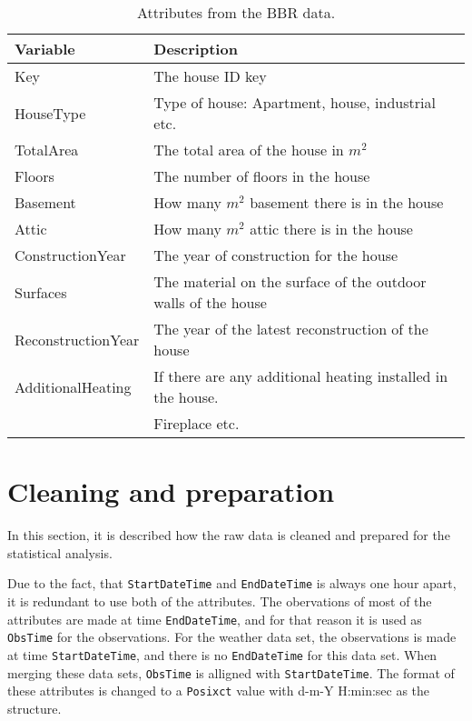 \begin{table}[H]
    \centering
    \begin{tabular}{ll}
     \hline
     \textbf{Variable} & \textbf{Description} \\
    \hline
    \hline
    Key  &  The house ID key\\
    HouseType  &  Type of house: Apartment, house, industrial etc. \\
    TotalArea  & The total area of the house in $m^2$ \\
    Floors  & The number of floors in the house \\
    Basement  & How many $m^2$ basement there is in the house \\
    Attic  & How many $m^2$ attic there is in the house \\
    ConstructionYear  & The year of construction for the house  \\
    Surfaces  & The material on the surface of the outdoor walls of the house \\
    ReconstructionYear  & The year of the latest reconstruction of the house \\
    AdditionalHeating  & If there are any additional heating installed in the house. \\ & Fireplace etc. \\
    \hline
    \end{tabular}
    \caption{Attributes from the BBR data.}
    \label{tab: BBR}
\end{table}   




\section{Cleaning and preparation}
In this section, it is described how the raw data is cleaned and prepared for the statistical analysis. 

\noindent Due to the fact, that \texttt{StartDateTime} and \texttt{EndDateTime} is always one hour apart, it is redundant to use both of the attributes. The obervations of most of the attributes are made at time \texttt{EndDateTime}, and for that reason it is used as \texttt{ObsTime} for the observations. For the weather data set, the observations is made at time \texttt{StartDateTime}, and there is no \texttt{EndDateTime} for this data set. When merging these data sets, \texttt{ObsTime} is alligned with \texttt{StartDateTime}. The format of these attributes is changed to a \texttt{Posixct} value with d-m-Y H:min:sec as the structure.

